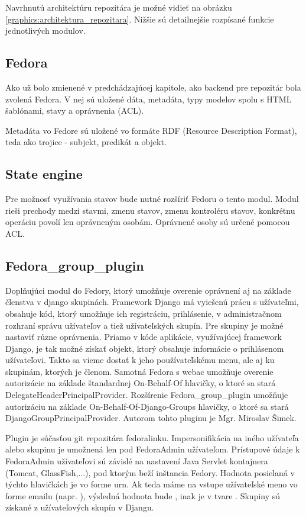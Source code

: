 \documentclass[thesis=M,slovak]{FITthesis}[2013/05/06]
\begin{document}
Navrhnutú architektúru repozitára je možné vidieť na obrázku \ref{graphics:architektura_repozitara}. Nižšie sú detailnejšie rozpísané funkcie jednotlivých modulov.

\subsection{Fedora}
Ako už bolo zmienené v predchádzajúcej kapitole, ako backend pre repozitár bola zvolená Fedora. V nej sú uložené dáta, metadáta, typy modelov spolu s HTML šablónami, stavy a oprávnenia (ACL).

Metadáta vo Fedore sú uložené vo formáte RDF (Resource Description Format), teda ako trojice - subjekt, predikát a objekt.

\subsection{State engine}
Pre možnosť využívania stavov bude nutné rozšíriť Fedoru o tento modul. Modul rieši prechody medzi stavmi, zmenu stavov, zmenu kontroléru stavov, konkrétnu operáciu povolí len oprávneným osobám. Oprávnené osoby sú určené pomocou ACL.

\subsection{Fedora\_group\_plugin}
Doplňujúci modul do Fedory, ktorý umožňuje overenie oprávnení aj na základe členstva v django skupinách. Framework Django má vyiešenú prácu s užívateľmi, obsahuje kód, ktorý umožňuje ich registráciu, prihlásenie, v administračnom rozhraní správu užívateľov a tiež užívateľských skupín. Pre skupiny je možné nastaviť různe oprávnenia. Priamo v kóde aplikácie, využívajúcej framework Django, je tak možné získať objekt, ktorý obsahuje informácie o prihlásenom užívateľovi. Takto sa vieme dostať k jeho používateľskému menu, ale aj ku skupinám, ktorých je členom. Samotná Fedora s webac umožňuje overenie autorizácie na základe štandardnej On-Behalf-Of hlavičky, o ktoré sa stará DelegateHeaderPrincipalProvider. Rozšírenie Fedora\_group\_plugin umožňuje autorizáciu na základe On-Behalf-Of-Django-Groups hlavičky, o ktoré sa stará DjangoGroupPrincipalProvider. Autorom tohto pluginu je Mgr. Miroslav Šimek. 

Plugin je súčasťou git repozitára fedoralinku. Impersonifikácia na iného užívateľa alebo skupinu je umožnená len pod FedoraAdmin užívateľom. Prístupové údaje k FedoraAdmin užívateľovi sú závislé na nastavení Java Servlet kontajnera (Tomcat, GlassFish,...), pod ktorým beží inštancia Fedory. Hodnota posielaná v týchto hlavičkách je vo forme urn.
Ak teda máme na vstupe užívateľské meno vo forme emailu (napr. ), výsledná hodnota bude , inak je v tvare . 
Skupiny sú získané z užívateľových skupín v Djangu.
\end{document}
